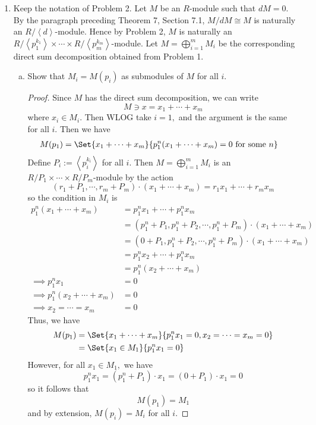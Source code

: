 \documentclass{article}
\begin{document}
\begin{enumerate}
	\item Keep the notation of Problem 2. Let $M$ be an $R$-module such that $dM=0.$ By the paragraph preceding Theorem 7, Section 7.1, $M/dM\cong M$ is naturally an $R/\left< d\right>$-module. Hence by Problem 2, $M$ is naturally an $R/\left< p_1^{k_1}\right>\times\cdots\times R/\left< p_m^{k_m}\right>$-module. Let $M=\bigoplus_{i=1}^m M_i$ be the corresponding direct sum decomposition obtained from Problem 1.
		\begin{enumerate}[(a)]
			\item Show that $M_i=M(p_i)$ as submodules of $M$ for all $i.$
				\begin{proof}
					Since $M$ has the direct sum decomposition, we can write
					\[M\ni x=x_1+\cdots+x_m\]
					where $x_i\in M_i.$ Then WLOG take $i=1,$ and the argument is the same for all $i.$ Then we have
					\begin{align*}
						M(p_1) &= \Set{x_1+\cdots+x_m}{p_1^n(x_1+\cdots+x_m)=0\text{ for some }n}
					\end{align*}
					Define $P_i:=\left< p_i^{k_i}\right>$ for all $i.$ Then $M=\bigoplus_{i=1}^m M_i$ is an $R/P_1\times\cdots\times R/P_m$-module by the action
					\[(r_1+P_1, \cdots, r_m+P_m)\cdot(x_1+\cdots+x_m) = r_1x_1+\cdots+r_mx_m\]
					so the condition in $M_i$ is
					\begin{align*}
						p_1^n(x_1+\cdots+x_m) &= p_1^nx_1+\cdots+p_1^n x_m \\
						&= (p_1^n+P_1, p_1^n+P_2, \cdots, p_1^n+P_m)\cdot(x_1+\cdots+x_m) \\
						&= (0+P_1, p_1^n+P_2, \cdots, p_1^n+P_m)\cdot(x_1+\cdots+x_m) \\
						&= p_1^nx_2+\cdots+p_1^nx_m \\
						&= p_1^n(x_2+\cdots+x_m) \\
						\implies p_1^n x_1 &= 0 \\
						\implies p_1^n(x_2+\cdots+x_m) &= 0 \\
						\implies x_2=\cdots=x_m&=0
					\end{align*}
					Thus, we have
					\begin{align*}
						M(p_1) &= \Set{x_1+\cdots+x_m}{p_1^nx_1=0, x_2=\cdots=x_m=0} \\
						&= \Set{x_1\in M_1}{p_1^n x_1=0}
					\end{align*}
					However, for all $x_1\in M_1,$ we have
					\[p_1^nx_1=(p_1^n + P_1)\cdot x_1 = (0+P_1)\cdot x_1=0\]
					so it follows that
					\[M(p_1)=M_1\]
					and by extension, $M(p_i)=M_i$ for all $i.$
				\end{proof}


\end{enumerate}
\end{enumerate}
\end{document}
